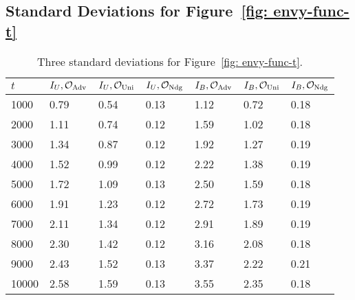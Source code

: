 \subsection{Standard Deviations for Figure~\ref{fig: envy-func-t}}\label{appendix: simulations}
\begin{table}[!ht]
    \centering
    \caption{Three standard deviations for Figure~\ref{fig: envy-func-t}.}\label{table}
    \begin{tabular}{|l|l|l|l|l|l|l|}
    \hline
        $t$ & $I_U, \mathcal O_{\textnormal{Adv}}$ & $I_U, \mathcal O_{\textnormal{Uni}}$ & $I_U, \mathcal O_{\textnormal{Ndg}}$ & $I_B, \mathcal O_{\textnormal{Adv}}$ & $I_B, \mathcal O_{\textnormal{Uni}}$ &  $I_B, \mathcal O_{\textnormal{Ndg}}$ \\ \hline
        1000 & 0.79 & 0.54 & 0.13 & 1.12 & 0.72 & 0.18 \\ \hline
        2000 & 1.11 & 0.74 & 0.12 & 1.59 & 1.02 & 0.18 \\ \hline
        3000 & 1.34 & 0.87 & 0.12 & 1.92 & 1.27 & 0.19 \\ \hline
        4000 & 1.52 & 0.99 & 0.12 & 2.22 & 1.38 & 0.19 \\ \hline
        5000 & 1.72 & 1.09 & 0.13 & 2.50 & 1.59 & 0.18 \\ \hline
        6000 & 1.91 & 1.23 & 0.12 & 2.72 & 1.73 & 0.19 \\ \hline
        7000 & 2.11 & 1.34 & 0.12 & 2.91 & 1.89 & 0.19 \\ \hline
        8000 & 2.30 & 1.42 & 0.12 & 3.16 & 2.08 & 0.18 \\ \hline
        9000 & 2.43 & 1.52 & 0.13 & 3.37 & 2.22 & 0.21 \\ \hline
        10000 & 2.58 & 1.59 & 0.13 & 3.55 & 2.35 & 0.18 \\ \hline
    \end{tabular}
\end{table}